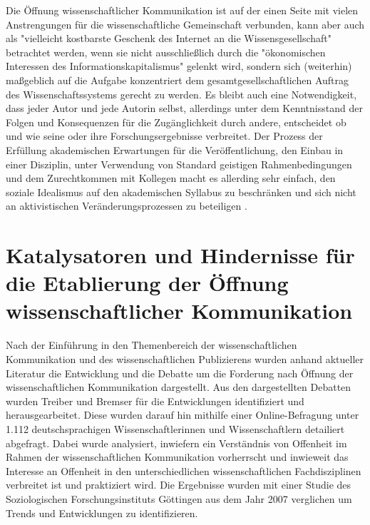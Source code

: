 Die Öffnung wissenschaftlicher Kommunikation ist auf der einen Seite mit vielen Anstrengungen für die wissenschaftliche Gemeinschaft verbunden, kann aber auch als "vielleicht kostbarste Geschenk des Internet an die Wissensgesellschaft" betrachtet werden, wenn sie nicht ausschließlich durch die "ökonomischen Interessen des Informationskapitalismus" \cite{hagner_2015_sache_buches} gelenkt wird, sondern sich (weiterhin) maßgeblich auf die Aufgabe konzentriert dem gesamtgesellschaftlichen Auftrag des Wissenschaftssystems gerecht zu werden. Es bleibt auch eine Notwendigkeit, dass jeder Autor und jede Autorin selbst, allerdings unter dem Kenntnisstand der Folgen und Konsequenzen für die Zugänglichkeit durch andere, entscheidet ob und wie seine oder ihre Forschungsergebnisse verbreitet. Der Prozess der Erfüllung akademischen Erwartungen für die Veröffentlichung, den Einbau in einer Disziplin, unter Verwendung von Standard geistigen Rahmenbedingungen und dem Zurechtkommen mit Kollegen macht es allerding sehr einfach, den soziale Idealismus auf den akademischen Syllabus zu beschränken und sich nicht an aktivistischen Veränderungsprozessen zu beteiligen \cite[:25]{flood_2013_combining}.

\section{Katalysatoren und Hindernisse für die Etablierung der Öffnung wissenschaftlicher Kommunikation}

Nach der Einführung in den Themenbereich der wissenschaftlichen Kommunikation und des wissenschaftlichen Publizierens wurden anhand aktueller Literatur die Entwicklung und die Debatte um die Forderung nach Öffnung der wissenschaftlichen Kommunikation dargestellt. Aus den dargestellten Debatten wurden Treiber und Bremser für die Entwicklungen identifiziert und herausgearbeitet. Diese wurden darauf hin mithilfe einer Online-Befragung unter 1.112 deutschsprachigen Wissenschaftlerinnen und Wissenschaftlern detailiert abgefragt. Dabei wurde analysiert, inwiefern ein Verständnis von Offenheit im Rahmen der wissenschaftlichen Kommunikation vorherrscht und inwieweit das Interesse an Offenheit in den unterschiedlichen wissenschaftlichen Fachdisziplinen verbreitet ist und praktiziert wird. Die Ergebnisse wurden mit einer Studie des Soziologischen Forschungsinstituts Göttingen aus dem Jahr 2007 verglichen um Trends und Entwicklungen zu identifizieren.

